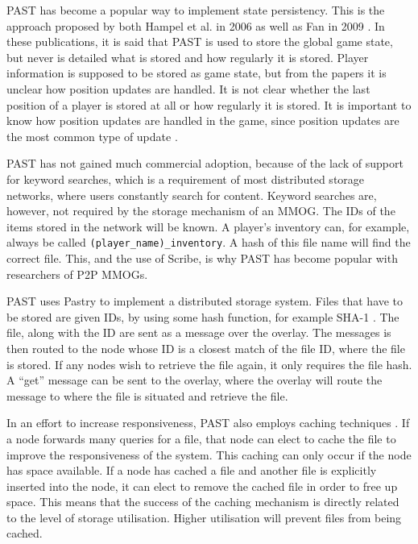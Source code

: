 \documentclass[10pt,a4paper,journal,cspaper,compsoc]{IEEEtran}
\begin{document}
PAST has become a popular way to implement state persistency. This is the approach proposed by both Hampel et al. in 2006 \cite{past_storage_focus}
as well as Fan in 2009 \cite{Fan_phd}. In these publications, it is said that PAST is used to store the global game state, but never is detailed what
is stored and how regularly it is stored. Player information is supposed to be stored as game state, but from the papers it is unclear how position
updates are handled. It is not clear whether the last position of a player is stored at all or how regularly it is stored. It is important to know
how position updates are handled in the game, since position updates are the most common type of update \cite{knutsson_p2p_first}.

PAST has not gained much commercial adoption, because of the lack of support for keyword searches, which is a requirement of most distributed storage
networks, where users constantly search for content. Keyword searches are, however, not required by the storage mechanism of an MMOG. The IDs of the
items stored in the network will be known. A player's inventory can, for example, always be called \verb.(player_name)_inventory.. A hash of this
file name will find the correct file. This, and the use of Scribe, is why PAST has become popular with researchers of P2P MMOGs.

PAST \cite{PAST_storage} uses Pastry to implement a distributed storage system. Files that have to be stored are given IDs, by using some hash
function, for example SHA-1 \cite{SHA}. The file, along with the ID are sent as a message over the overlay. The messages is then routed to the node
whose ID is a closest match of the file ID, where the file is stored. If any nodes wish to retrieve the file again, it only requires the file hash. A
``get'' message can be sent to the overlay, where the overlay will route the message to where the file is situated and retrieve the file.

In an effort to increase responsiveness, PAST also employs caching techniques \cite{storage_and_chaching_PAST}. If a node forwards many queries for a
file, that node can elect to cache the file to improve the responsiveness of the system. This caching can only occur if the node has space available.
If a node has cached a file and another file is explicitly inserted into the node, it can elect to remove the cached file in order to free up space.
This means that the success of the caching mechanism is directly related to the level of storage utilisation. Higher utilisation will prevent files
from being cached.
\end{document}
